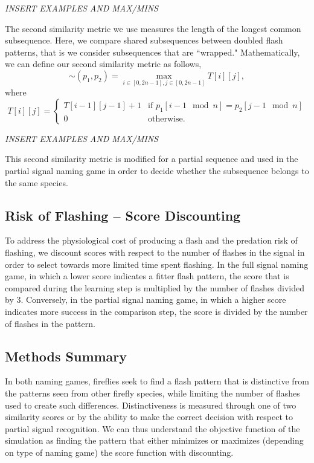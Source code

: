 \emph{INSERT EXAMPLES AND MAX/MINS}

The second similarity metric we use measures the length of the longest common subsequence. Here, we compare shared subsequences between doubled flash patterns, that is we consider subsequences that are ``wrapped." 
 Mathematically, we can define our second similarity metric as follows,
\[ \sim (p_1, p_2) =  \max _{i \in [0,2n-1], j \in [0,2n-1]} T[i][j], \] 
where {\tiny \[ T[i][j] = \begin{cases} T[i-1][j-1] + 1 &\textrm{if } p_1[i-1 \mod n] = p_2[j-1 \mod n] \\
	0 &\textrm{otherwise.} \end{cases}\]}
	
\emph{INSERT EXAMPLES AND MAX/MINS}

This second similarity metric is modified for a partial sequence and used in the partial signal naming game in order to decide whether the subsequence belongs to the same species. 

\subsection{Risk of Flashing -- Score Discounting}
To address the physiological cost of producing a flash and the predation risk of flashing, we discount scores with respect to the number of flashes in the signal in order to select towards more limited time spent flashing. 
In the full signal naming game, in which a lower score indicates a fitter flash pattern, the score that is compared during the learning step is multiplied by the number of flashes divided by 3. 
Conversely, in the partial signal naming game, in which a higher score indicates more success in the comparison step, the score is divided by the number of flashes in the pattern. 




\subsection{Methods Summary}
In both naming games, fireflies seek to find a flash pattern that is distinctive from the patterns seen from other firefly species, while limiting the number of flashes used to create such differences.
Distinctiveness is measured through one of two similarity scores or by the ability to make the correct decision with respect to partial signal recognition.
We can thus understand the objective function of the simulation as finding the pattern that either minimizes or maximizes (depending on type of naming game) the score function with discounting. 

